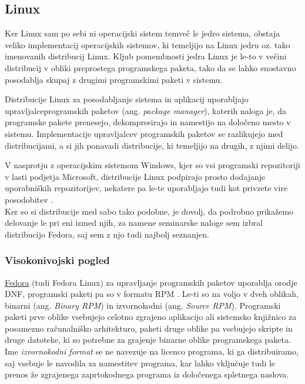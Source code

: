 \subsection{Linux}

Ker Linux sam po sebi ni operacijski sistem temveč le jedro sistema, obstaja veliko implementacij operacijskih sistemov,
ki temeljijo na Linux jedru oz. tako imenovanih distribucij Linux.
Kljub pomembnosti jedra Linux je le-to v večini distribucij v obliki preprostega programskega paketa,
tako da se lahko enostavno posodablja skupaj z drugimi programskimi paketi v sistemu.

Distribucije Linux za posodabljanje sistema in aplikacij uporabljajo upravljalce\linebreak programskih paketov
(ang. \emph{package manager}), katerih naloga je, da programske pakete prenesejo,
dekompresirajo in namestijo na določeno mesto v sistemu.
Implementacije upravljalcev programskih paketov se razlikujejo med distribucijami,
a si jih ponavadi distribucije, ki temeljijo na drugih, z njimi delijo.

V nasprotju z operacijskim sistemom Windows, kjer so vsi programski repozitoriji v lasti podjetja Microsoft,
distribucije Linux podpirajo prosto dodajanje uporabniških repozitorijev, nekatere pa le-te uporabljajo tudi
kot privzete vire posodobitev \cite{arch-mirrors}.\\

Ker so si distribucije med sabo tako podobne, je dovolj, da podrobno prikažemo delovanje le pri eni izmed njih, za
namene seminarske naloge sem izbral distribucijo Fedora, saj sem z njo tudi najbolj seznanjen.

\subsubsection{Visokonivojski pogled}

\href{https://getfedora.org/}{Fedora} (tudi Fedora Linux) za upravljanje programskih paketov uporablja
orodje DNF, programski paketi pa so v formatu RPM \cite{rpm}.
Le-ti so na voljo v dveh oblikah, binarni (ang. \emph{Binary RPM}) in izvornokodni (ang. \emph{Source RPM}).
Programski paketi prve oblike vsebujejo celotno zgrajeno aplikacijo ali sistemsko knjižnico za posamezno
računalniško arhitekturo, paketi druge oblike pa vsebujejo skripte in druge datoteke, ki so potrebne za grajenje
binarne oblike programskega paketa.
Ime \emph{izvornokodni format} se ne navezuje na licenco programa, ki ga distribuiramo, saj vsebuje le navodila
za namestitev programa, kar lahko vključuje tudi le prenos že zgrajenega zaprtokodnega programa
iz določenega spletnega naslova.

